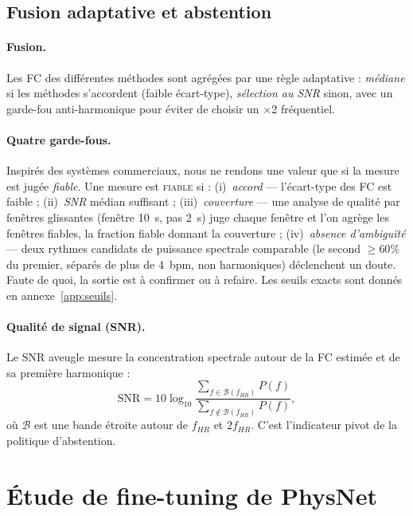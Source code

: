 \documentclass[11pt]{article}
\begin{document}
\subsection{Fusion adaptative et abstention}
\label{sec:abstention}
\paragraph{Fusion.} Les FC des différentes méthodes sont agrégées par une règle
adaptative : \emph{médiane} si les méthodes s'accordent (faible écart-type),
\emph{sélection au SNR} sinon, avec un garde-fou anti-harmonique pour éviter de
choisir un $\times$2 fréquentiel.

\paragraph{Quatre garde-fous.} Inspirés des systèmes commerciaux, nous ne rendons une
valeur que si la mesure est jugée \emph{fiable}. Une mesure est \textsc{fiable} si :
(i)~\emph{accord} --- l'écart-type des FC est faible ; (ii)~\emph{SNR} médian
suffisant ; (iii)~\emph{couverture} --- une analyse de qualité par fenêtres
glissantes (fenêtre 10~s, pas 2~s) juge chaque fenêtre et l'on agrège les fenêtres
fiables, la fraction fiable donnant la couverture ; (iv)~\emph{absence d'ambiguïté}
--- deux rythmes candidats de puissance spectrale comparable (le second $\geq 60\%$ du
premier, séparés de plus de 4~bpm, non harmoniques) déclenchent un doute. Faute de
quoi, la sortie est \og{}à confirmer\fg{} ou \og{}à refaire\fg{}. Les seuils exacts sont donnés en
annexe~\ref{app:seuils}.

\paragraph{Qualité de signal (SNR).} Le SNR aveugle mesure la concentration
spectrale autour de la FC estimée et de sa première harmonique :
\begin{equation}
\mathrm{SNR} = 10\log_{10}
\frac{\sum_{f \in \mathcal{B}(f_{HR})} P(f)}{\sum_{f \notin \mathcal{B}(f_{HR})} P(f)},
\end{equation}
où $\mathcal{B}$ est une bande étroite autour de $f_{HR}$ et $2f_{HR}$. C'est
l'indicateur pivot de la politique d'abstention.

\section{Étude de fine-tuning de PhysNet}
\label{sec:ft}
\end{document}
